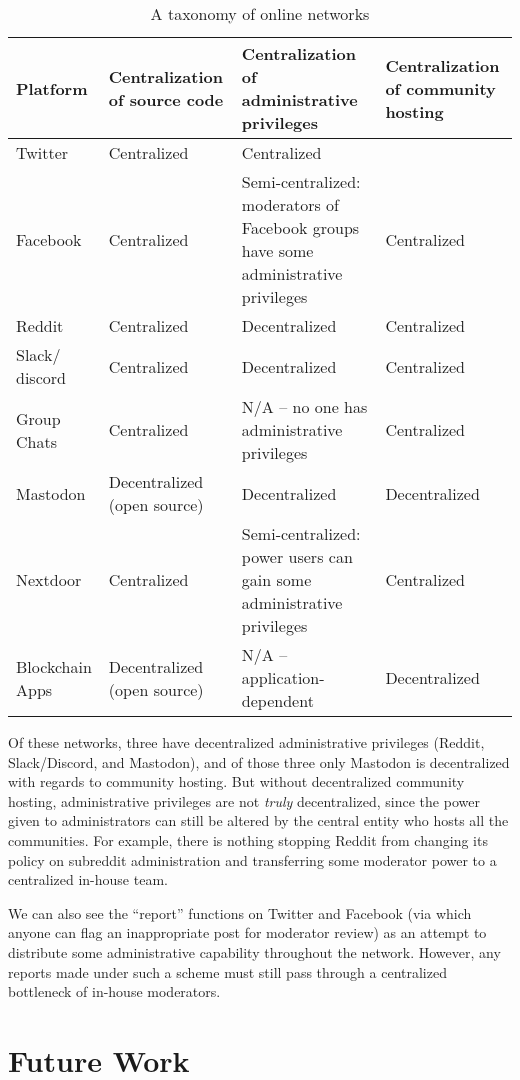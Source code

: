 \documentclass[sigconf,authordraft]{acmart}
\begin{document}
\begin{table*}
  \caption{A taxonomy of online networks}
  \label{tab:taxonomy}
  \begin{tabularx}{\textwidth}{llXX}
    \toprule
    Platform & Centralization of source code & Centralization of administrative privileges & Centralization of community hosting \\
    \midrule
    Twitter  & Centralized & Centralized\\
    Facebook & Centralized & Semi-centralized: moderators of Facebook groups have some administrative privileges & Centralized\\
    Reddit   & Centralized & Decentralized & Centralized  \\
    Slack/ discord & Centralized & Decentralized & Centralized \\
    Group Chats & Centralized & N/A -- no one has administrative privileges & Centralized \\
    Mastodon & Decentralized (open source) & Decentralized & Decentralized\\
    Nextdoor & Centralized & Semi-centralized: power users can gain some administrative privileges & Centralized \\
    Blockchain Apps & Decentralized (open source) & N/A -- application-dependent & Decentralized\\
    \bottomrule
  \end{tabularx}
\end{table*}

Of these networks, three have decentralized administrative privileges (Reddit, Slack/Discord, and Mastodon), and of those three only Mastodon is decentralized with regards to community hosting. But without decentralized community hosting, administrative privileges are not {\itshape truly} decentralized, since the power given to administrators can still be altered by the central entity who hosts all the communities. For example, there is nothing stopping Reddit from changing its policy on subreddit administration and transferring some moderator power to a centralized in-house team.

We can also see the ``report'' functions on Twitter and Facebook (via which anyone can flag an inappropriate post for moderator review) as an attempt to distribute some administrative capability throughout the network. However, any reports made under such a scheme must still pass through a centralized bottleneck of in-house moderators. 

\section{Future Work}
\end{document}
